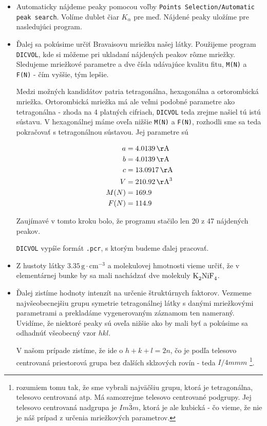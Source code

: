\documentclass[a4paper, 10pt]{article}
\newcommand{\unit}[1]{\ensuremath{\, \mathrm{#1}}}
\begin{document}
\begin{itemize}
\item Automaticky nájdeme peaky pomocou voľby \texttt{Points Selection/Automatic peak search}. Volíme dublet čiar $K_\alpha$ pre meď. Nájdené peaky uložíme pre nasledujúci program. 
\item Ďalej sa pokúsime určiť Bravaisovu mriežku našej látky. Použijeme program \texttt{DICVOL}, kde si môžeme pri ukladaní nájdených peakov rôzne mriežky. Sledujeme mriežkové parametre a dve čísla udávajúce kvalitu fitu, \texttt{M(N)} a \texttt{F(N)} - čím vyššie, tým lepšie.

Medzi možných kandidátov patria tetragonálna, hexagonálna a ortorombická mriežka. Ortorombická mriežka má ale veľmi podobné parametre ako tetragonálna - zhoda na 4 platných cifriach, \texttt{DICVOL} teda zrejme našiel tú istú sústavu. V hexagonálnej máme oveľa nižšie \texttt{M(N)} a \texttt{F(N)}, rozhodli sme sa teda pokračovať s tetragonálnou sústavou. Jej parametre sú

\begin{align*}
a&=4.0139 \unit\AA  \\
b&=4.0139 \unit\AA  \\
c &= 13.0917 \unit\AA \\
V &= 210.92 \unit\AA ^3\\
M(N) &= 169.9 \\
F(N) &= 114.9
\end{align*}

Zaujímavé v tomto kroku bolo, že programu stačilo len 20 z 47 nájdených peakov. 

\texttt{DICVOL} vypíše formát \texttt{.pcr}, s ktorým budeme ďalej pracovať.

\item Z hustoty látky $3.35 \unit{g\cdot cm^{-3}}$ a molekulovej hmotnosti vieme určiť, že v elementárnej bunke by sa mali nachádzať dve molekuly $\ce{K2NiF4}$.

\item Ďalej zistíme hodnoty intenzít na určenie štruktúrnych faktorov. Vezmeme najvšeobecnejšiu grupu symetrie tetragonálnej látky s danými mriežkovými parametrami a prekladáme vygenerovaným záznamom ten nameraný. Uvidíme, že niektoré peaky sú oveľa nižšie ako by mali byť a pokúsime sa odhadnúť všeobecný vzor $hkl$.

V našom prípade zistíme, že ide o $h+k+l = 2n$, čo je podľa \cite{tab} telesovo centrovaná priestorová grupa bez ďalších sklzových rovín - teda $I/4mmm$ \footnote{rozumiem tomu tak, že sme vybrali najväčšiu grupu, ktorá je tetragonálna, telesovo centrovaná atp. Má samozrejme telesovo centrované podgrupy. Jej telesovo centrovaná nadgrupa je $Im\bar{3}m$, ktorá je ale kubická - čo vieme, že nie je náš prípad z určenia mriežkových parametrov.}.


\end{itemize}
\end{document}
